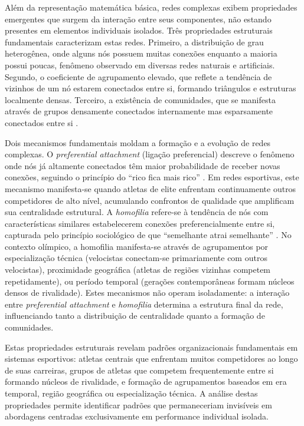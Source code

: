 Além da representação matemática básica, redes complexas exibem propriedades emergentes que surgem da interação entre seus componentes, não estando presentes em elementos individuais isolados. Três propriedades estruturais fundamentais caracterizam estas redes. Primeiro, a distribuição de grau heterogênea, onde alguns nós possuem muitas conexões enquanto a maioria possui poucas, fenômeno observado em diversas redes naturais e artificiais. Segundo, o coeficiente de agrupamento elevado, que reflete a tendência de vizinhos de um nó estarem conectados entre si, formando triângulos e estruturas localmente densas. Terceiro, a existência de comunidades, que se manifesta através de grupos densamente conectados internamente mas esparsamente conectados entre si \cite{Fortunato2010CommunityDetection}.

Dois mecanismos fundamentais moldam a formação e a evolução de redes complexas. O \textit{preferential attachment} (ligação preferencial) descreve o fenômeno onde nós já altamente conectados têm maior probabilidade de receber novas conexões, seguindo o princípio do ``rico fica mais rico'' \cite{Barabasi1999Emergence}. Em redes esportivas, este mecanismo manifesta-se quando atletas de elite enfrentam continuamente outros competidores de alto nível, acumulando confrontos de qualidade que amplificam sua centralidade estrutural. A \textit{homofilia} refere-se à tendência de nós com características similares estabelecerem conexões preferencialmente entre si, capturada pelo princípio sociológico de que ``semelhante atrai semelhante'' \cite{McPherson2001Homophily}. No contexto olímpico, a homofilia manifesta-se através de agrupamentos por especialização técnica (velocistas conectam-se primariamente com outros velocistas), proximidade geográfica (atletas de regiões vizinhas competem repetidamente), ou período temporal (gerações contemporâneas formam núcleos densos de rivalidade). Estes mecanismos não operam isoladamente: a interação entre \textit{preferential attachment} e \textit{homofilia} determina a estrutura final da rede, influenciando tanto a distribuição de centralidade quanto a formação de comunidades.

Estas propriedades estruturais revelam padrões organizacionais fundamentais em sistemas esportivos: atletas centrais que enfrentam muitos competidores ao longo de suas carreiras, grupos de atletas que competem frequentemente entre si formando núcleos de rivalidade, e formação de agrupamentos baseados em era temporal, região geográfica ou especialização técnica. A análise destas propriedades permite identificar padrões que permaneceriam invisíveis em abordagens centradas exclusivamente em performance individual isolada.

